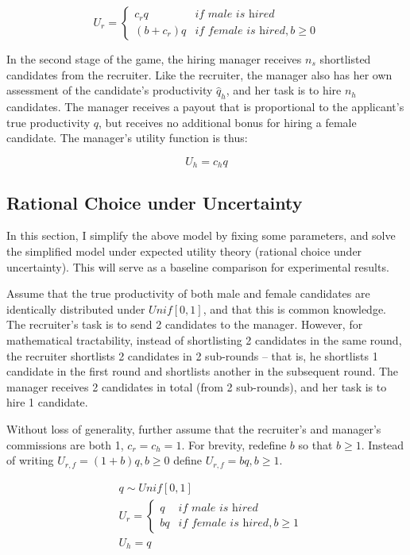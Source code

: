 \documentclass[11pt]{article}
\begin{document}
\[  U_r =
    \begin{cases}
        c_rq     & \textit{if male is hired}             \\
        (b+c_r)q & \textit{if female is hired}, b \geq 0
    \end{cases}
\]

In the second stage of the game, the hiring manager receives $n_s$ shortlisted candidates from the recruiter. Like the recruiter, the manager also has her own assessment of the candidate's productivity $\hat{q}_h$, and her task is to hire $n_h$ candidates. The manager receives a payout that is proportional to the applicant's true productivity $q$, but receives no additional bonus for hiring a female candidate. The manager's utility function is thus:

$$U_h = c_hq$$

\subsection{Rational Choice under Uncertainty}

In this section, I simplify the above model by fixing some parameters, and solve the simplified model under expected utility theory (rational choice under uncertainty). This will serve as a baseline comparison for experimental results.

Assume that the true productivity of both male and female candidates are identically distributed under $\textit{Unif}[0,1]$, and that this is common knowledge.
The recruiter's task is to send 2 candidates to the manager. However, for mathematical tractability, instead of shortlisting 2 candidates in the same round, the recruiter shortlists 2 candidates in 2 sub-rounds -- that is, he shortlists 1 candidate in the first round and shortlists another in the subsequent round. The manager receives 2 candidates in total (from 2 sub-rounds), and her task is to hire 1 candidate.

Without loss of generality, further assume that the recruiter's and manager's commissions are both 1, $c_r=c_h=1$. For brevity, redefine $b$ so that $b \geq 1$. Instead of writing $U_{r,f} = (1+b)q, b \geq 0$  define $U_{r,f} = bq, b \geq 1$.

\begin{align*}
     & q \sim \textit{Unif}[0,1] \\
     & U_r =
    \begin{cases}
        q  & \textit{if male is hired}             \\
        bq & \textit{if female is hired}, b \geq 1
    \end{cases}    \\
     & U_h = q
\end{align*}
\end{document}
